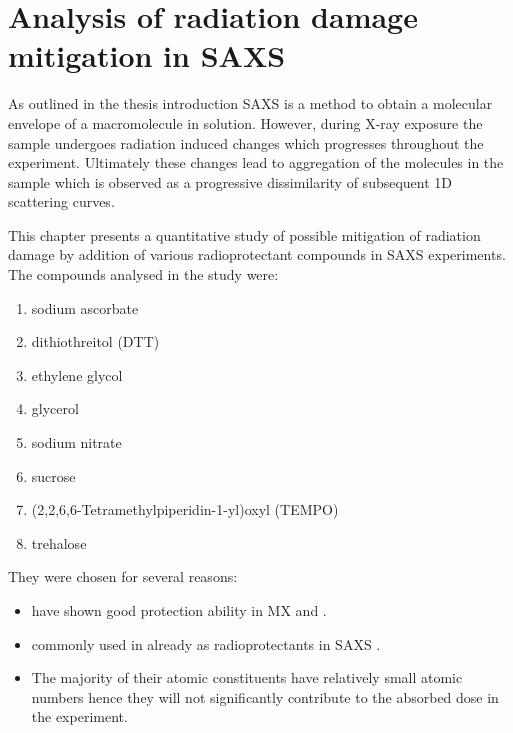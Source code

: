 \chapter{Analysis of radiation damage mitigation in SAXS}
\label{chap:Analysis of Radiation Damage in SAXS}

 As outlined in the thesis introduction SAXS is a method to obtain a molecular envelope of a macromolecule in solution.
 However, during X-ray exposure the sample undergoes radiation induced changes which progresses throughout the experiment.
 Ultimately these changes lead to aggregation of the molecules in the sample which is observed as a progressive dissimilarity of subsequent 1D scattering curves.

 This chapter presents a quantitative study of possible mitigation of radiation damage by addition of various radioprotectant compounds in SAXS experiments.
 The compounds analysed in the study were:
 \begin{enumerate}
     \item sodium ascorbate
     \item dithiothreitol (DTT)
     \item ethylene glycol
     \item glycerol
     \item sodium nitrate
     \item sucrose
     \item (2,2,6,6-Tetramethylpiperidin-1-yl)oxyl (TEMPO)
     \item trehalose
 \end{enumerate}
 They were chosen for several reasons:
 \begin{itemize}
     \item have shown good protection ability in MX \cite{allan2012} and \cite{southworth2007radioprotectant}.
     \item commonly used in already as radioprotectants in SAXS \cite{grishaev2012sample}.
     \item The majority of their atomic constituents have relatively small atomic numbers hence they will not significantly contribute to the absorbed dose in the experiment.
 \end{itemize}
 
